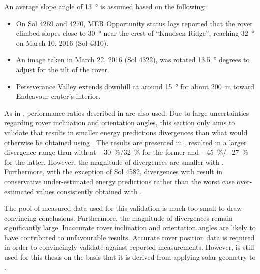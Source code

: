 An average slope angle of \SI{13}{\degree} is assumed based on the following:
\begin{itemize}
  \item On Sol 4269 and 4270, \ac{MER} Opportunity status logs reported that the rover climbed slopes close to \SI{30}{\degree} near the crest of ``Knudsen Ridge'', reaching \SI{32}{\degree} on March 10, 2016 (Sol 4310).
  \item An image taken in March 22, 2016 (Sol 4322), was rotated \SI{13.5}{\degree} degrees to adjust for the tilt of the rover.
  \item Perseverance Valley extends downhill at around \SI{15}{\degree} for about \SI{200}{\meter} toward Endeavour crater's interior.
\end{itemize}

As in , performance ratios described in  are also used. Due to large uncertainties regarding rover inclination and orientation angles, this section only aims to validate that  results in smaller energy predictions divergences than what would otherwise be obtained using . The results are presented in .  resulted in a larger divergence range than with  at \SI{-30}{\percent}/\SI{32}{\percent} for the former and \SI{-45}{\percent}/\SI{-27}{\percent} for the latter. However, the magnitude of divergences are smaller with . Furthermore, with the exception of Sol 4582, divergences with  result in conservative under-estimated energy predictions rather than the worst case over-estimated values consistently obtained with .

\clearpage


The pool of measured data used for this validation is much too small to draw convincing conclusions. Furthermore, the magnitude of divergences remain significantly large. Inaccurate rover inclination and orientation angles are likely to have contributed to unfavourable results. Accurate rover position data is required in order to convincingly validate  against reported measurements. However,  is still used for this thesis on the basis that it is derived from applying solar geometry to .


